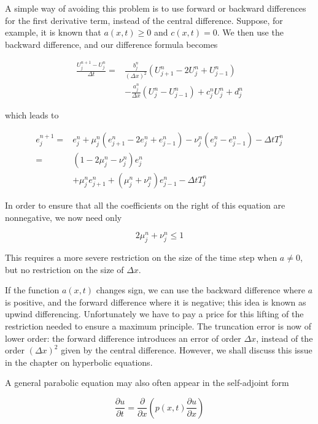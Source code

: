 \documentclass[10pt]{article}
\begin{document}
A simple way of avoiding this problem is to use forward or backward differences for the first derivative term, instead of the central difference. Suppose, for example, it is known that \(a(x, t) \geq 0\) and \(c(x, t)=0\). We then use the backward difference, and our difference formula becomes

\[
\begin{aligned}
\frac{U_{j}^{n+1}-U_{j}^{n}}{\Delta t}= & \frac{b_{j}^{n}}{(\Delta x)^{2}}\left(U_{j+1}^{n}-2 U_{j}^{n}+U_{j-1}^{n}\right) \\
& -\frac{a_{j}^{n}}{\Delta x}\left(U_{j}^{n}-U_{j-1}^{n}\right)+c_{j}^{n} U_{j}^{n}+d_{j}^{n}
\end{aligned}
\]

which leads to

\[
\begin{aligned}
e_{j}^{n+1}= & e_{j}^{n}+\mu_{j}^{n}\left(e_{j+1}^{n}-2 e_{j}^{n}+e_{j-1}^{n}\right)-\nu_{j}^{n}\left(e_{j}^{n}-e_{j-1}^{n}\right)-\Delta t T_{j}^{n} \\
= & \left(1-2 \mu_{j}^{n}-\nu_{j}^{n}\right) e_{j}^{n} \\
& +\mu_{j}^{n} e_{j+1}^{n}+\left(\mu_{j}^{n}+\nu_{j}^{n}\right) e_{j-1}^{n}-\Delta t T_{j}^{n}
\end{aligned}
\]

In order to ensure that all the coefficients on the right of this equation are nonnegative, we now need only

\[
2 \mu_{j}^{n}+\nu_{j}^{n} \leq 1
\]

This requires a more severe restriction on the size of the time step when \(a \neq 0\), but no restriction on the size of \(\Delta x\).

If the function \(a(x, t)\) changes sign, we can use the backward difference where \(a\) is positive, and the forward difference where it is negative; this idea is known as upwind differencing. Unfortunately we have to pay a price for this lifting of the restriction needed to ensure a maximum principle. The truncation error is now of lower order: the forward difference introduces an error of order \(\Delta x\), instead of the order \((\Delta x)^{2}\) given by the central difference. However, we shall discuss this issue in the chapter on hyperbolic equations.

A general parabolic equation may also often appear in the self-adjoint form

\[
\frac{\partial u}{\partial t}=\frac{\partial}{\partial x}\left(p(x, t) \frac{\partial u}{\partial x}\right)
\]
\end{document}
